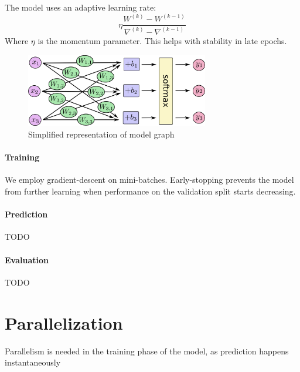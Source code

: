 \documentclass[a4paper]{article}
\begin{document}
The model uses an adaptive learning rate:
$$\eta \frac{ W^{(k)} - W^{(k-1)} } { \nabla^{(k)} - \nabla^{(k-1)} }$$
Where $\eta$ is the momentum parameter. This helps with stability in late epochs.

\begin{figure}[htb]
\centering
\includegraphics[width=8cm]{images/model-graph.png}
\caption{Simplified representation of model graph \cite{tf}}
\end{figure}

\paragraph{Training} We employ gradient-descent on mini-batches. Early-stopping prevents the model from further learning when performance on the validation split starts decreasing.

\paragraph{Prediction}
TODO

\paragraph{Evaluation}
TODO




\newpage
\section{Parallelization}
Parallelism is needed in the training phase of the model, as prediction happens instantaneously
\end{document}
